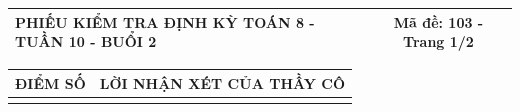 \documentclass[12pt,a4paper]{article}
\begin{document}
\newpage
\noindent
\begin{tabularx}{\linewidth}{|X|c|}
\hline
\textbf{PHIẾU KIỂM TRA ĐỊNH KỲ TOÁN 8 - TUẦN 10 - BUỔI 2} & \textbf{Mã đề: 103 - Trang 1/2} \\
\hline
\end{tabularx}

\vspace{1.2mm}

\noindent
\begin{tabularx}{\linewidth}{|p{3.2cm}|X|}
\hline
\centering\textbf{ĐIỂM SỐ} & \centering\textbf{LỜI NHẬN XÉT CỦA THẦY CÔ} \tabularnewline
\hline
\rule{0pt}{1.8cm} & \tabularnewline
\hline
\end{tabularx}
\end{document}
